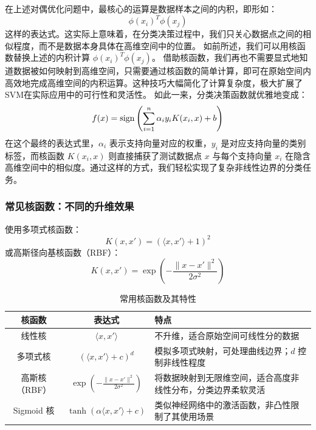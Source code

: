 在上述对偶优化问题中，最核心的运算是数据样本之间的内积，即形如：
\[
\phi(x_i)^T \phi(x_j)
\]
这样的表达式。这实际上意味着，在分类决策过程中，我们只关心数据点之间的相似程度，而不是数据本身具体在高维空间中的位置。
如前所述，我们可以用核函数替换上述的内积计算 $\phi(x_i)^T \phi(x_j)$。
借助核函数，我们再也不需要显式地知道数据被如何映射到高维空间，只需要通过核函数的简单计算，即可在原始空间内高效地完成高维空间的内积运算。这种技巧大幅简化了计算复杂度，极大扩展了SVM在实际应用中的可行性和灵活性。
如此一来，分类决策函数就优雅地变成：
\[
f(x) = {\rm sign}\left(\sum_{i=1}^n \alpha_i y_i K(x_i, x) + b \right)
\]
在这个最终的表达式里，\(\alpha_i\) 表示支持向量对应的权重，\(y_i\) 是对应支持向量的类别标签，而核函数 \(K(x_i,x)\) 则直接捕获了测试数据点 \(x\) 与每个支持向量 \(x_i\) 在隐含高维空间中的相似度。通过这样的方式，我们轻松实现了复杂非线性边界的分类任务。
%
%
\subsubsection{常见核函数：不同的升维效果}


使用多项式核函数：
\[
K(x, x') = (\langle x, x' \rangle + 1)^2
\]
或高斯径向基核函数（RBF）：\[
K(x, x') = \exp\left(-\frac{\|x - x'\|^2}{2\sigma^2}\right)
\]
\begin{table}[htbp]
\centering
\caption{常用核函数及其特性}
\begin{tabular}{|c|c|p{7cm}|}
\hline
\textbf{核函数} & \textbf{表达式} & \textbf{特点} \\
\hline
线性核 & $\langle x, x' \rangle$ & 不升维，适合原始空间可线性分的数据 \\
\hline 多项式核 & $(\langle x, x' \rangle + c)^d$ & 模拟多项式映射，可处理曲线边界；$d$ 控制非线性程度 \\
\hline
高斯核（RBF） & $\exp\left(-\frac{\|x - x'\|^2}{2\sigma^2}\right)$ & 将数据映射到无限维空间，适合高度非线性分布，分类边界柔软灵活 \\
\hline
Sigmoid 核 & $\tanh(\alpha \langle x, x' \rangle + c)$ & 类似神经网络中的激活函数，非凸性限制了其使用场景 \\
\hline
\end{tabular}
\label{tab:kernelfunctions}
\end{table}
